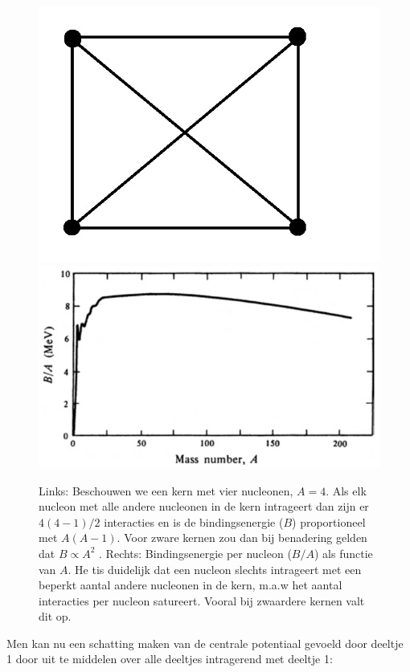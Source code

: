 \documentclass[12pt]{article}
\begin{document}
\begin{figure}
\centering 
\includegraphics[scale=0.3]{netwerk.png}
\includegraphics[scale=0.4]{binding_energy.png}
\caption{Links: Beschouwen we een kern met vier nucleonen, $A = 4$. Als elk nucleon met alle andere nucleonen in de kern intrageert dan zijn er $4(4-1)/2$ interacties en is de bindingsenergie ($B$) proportioneel met $A(A-1)$. Voor zware kernen zou dan bij benadering gelden dat $B \propto A^2$ . Rechts: Bindingsenergie per nucleon ($B/A$) als functie van $A$. He tis duidelijk dat een nucleon slechts intrageert met een beperkt aantal andere nucleonen in de kern, m.a.w het aantal interacties per nucleon satureert. Vooral bij zwaardere kernen valt dit op.}
\label{fig:bindings_energie}
\end{figure}
Men kan nu een schatting maken van de centrale potentiaal gevoeld door deeltje 1 door uit te middelen over alle deeltjes intragerend met deeltje 1:
\end{document}

